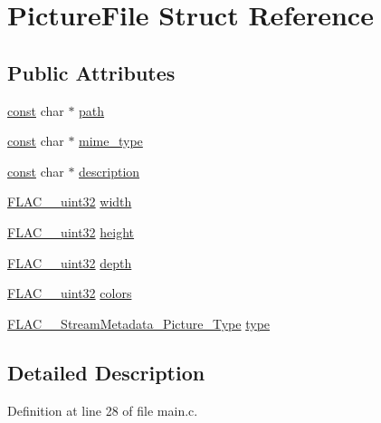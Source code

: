 \hypertarget{struct_picture_file}{}\section{Picture\+File Struct Reference}
\label{struct_picture_file}
\subsection*{Public Attributes}
\begin{DoxyCompactItemize}
\item 
\hyperlink{getopt1_8c_a2c212835823e3c54a8ab6d95c652660e}{const} char $\ast$ \hyperlink{struct_picture_file_ae82230df4f0fbc6bc8b81796f4d6dabc}{path}
\item 
\hyperlink{getopt1_8c_a2c212835823e3c54a8ab6d95c652660e}{const} char $\ast$ \hyperlink{struct_picture_file_a90610e2bb707c30a88a35283fe4b686c}{mime\+\_\+type}
\item 
\hyperlink{getopt1_8c_a2c212835823e3c54a8ab6d95c652660e}{const} char $\ast$ \hyperlink{struct_picture_file_ab662d36b1ceeaf480a7c3cdc010ef0a2}{description}
\item 
\hyperlink{ordinals_8h_a9c4005ea7ef8d564b0cc993cdd0e4e5e}{F\+L\+A\+C\+\_\+\+\_\+uint32} \hyperlink{struct_picture_file_ade47cebcf68a6d719588f7607d11d607}{width}
\item 
\hyperlink{ordinals_8h_a9c4005ea7ef8d564b0cc993cdd0e4e5e}{F\+L\+A\+C\+\_\+\+\_\+uint32} \hyperlink{struct_picture_file_a1713bc95e99abde8fc3e5c44b02aa7b6}{height}
\item 
\hyperlink{ordinals_8h_a9c4005ea7ef8d564b0cc993cdd0e4e5e}{F\+L\+A\+C\+\_\+\+\_\+uint32} \hyperlink{struct_picture_file_a5b8c51bb1a31ada6eb9135208c42e2e3}{depth}
\item 
\hyperlink{ordinals_8h_a9c4005ea7ef8d564b0cc993cdd0e4e5e}{F\+L\+A\+C\+\_\+\+\_\+uint32} \hyperlink{struct_picture_file_a90d41cf1d2f15a65e830cebf03191d8a}{colors}
\item 
\hyperlink{group__flac__format_gaf6d3e836cee023e0b8d897f1fdc9825d}{F\+L\+A\+C\+\_\+\+\_\+\+Stream\+Metadata\+\_\+\+Picture\+\_\+\+Type} \hyperlink{struct_picture_file_a2b2b97245e40b05a9173cffd7985a4f5}{type}
\end{DoxyCompactItemize}


\subsection{Detailed Description}


Definition at line 28 of file main.\+c.



